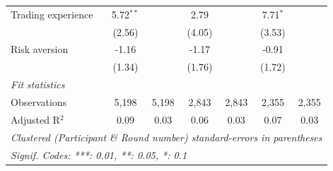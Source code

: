 \begin{tabular}{lcccccc}
   Trading experience                   & 5.72$^{**}$   &               & 2.79          &               & 7.71$^{*}$    &   \\   
                                        & (2.56)        &               & (4.05)        &               & (3.53)        &   \\   
   Risk aversion                        & -1.16         &               & -1.17         &               & -0.91         &   \\   
                                        & (1.34)        &               & (1.76)        &               & (1.72)        &   \\   
   \midrule
   \emph{Fit statistics}\\
   Observations                         & 5,198         & 5,198         & 2,843         & 2,843         & 2,355         & 2,355\\  
   Adjusted R$^2$                       & 0.09          & 0.03          & 0.06          & 0.03          & 0.07          & 0.03\\  
   \midrule \midrule
   \multicolumn{7}{l}{\emph{Clustered (Participant \& Round number) standard-errors in parentheses}}\\
   \multicolumn{7}{l}{\emph{Signif. Codes: ***: 0.01, **: 0.05, *: 0.1}}\\
\end{tabular}
\par\endgroup
